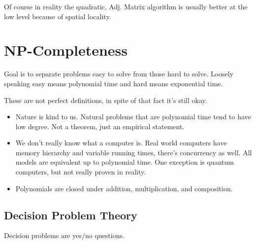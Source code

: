 \documentclass[english, 10pt]{article}
\begin{document}
Of course in reality the quadratic, Adj. Matrix algorithm is usually better at
the low level because of spatial locality.


\section{NP-Completeness}

Goal is to separate problems easy to solve from those hard to solve. Loosely
speaking easy means polynomial time and hard means exponential time.

These are not perfect definitions, in spite of that fact it's still okay.

\begin{itemize}
    \item Nature is kind to us. Natural problems that are polynomial time tend to have
low degree. Not a theorem, just an empirical statement.

    \item We don't really know what a computer is. Real world computers have memory
hierarchy and variable running times, there's concurrency as well. All models
are equivalent up to polynomial time. One exception is quantum computers, but
not really proven in reality.

    \item Polynomials are closed under addition, multiplication, and composition.
\end{itemize}

\subsection{Decision Problem Theory}
Decision problems are yes/no questions.
\end{document}
